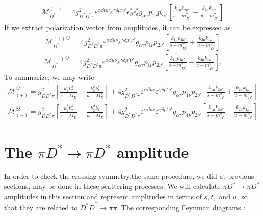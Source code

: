 \documentclass[aps,prd,preprintnumbers,showpacs,showkeys,nofootinbib,
superscriptaddress,fleqn,floatfix,tightenlines, 10pt]{revtex4-1}
\begin{document}
\begin{align}
	\mathcal{M}_{D^*}^{(-)} = 4g_{D^*D^*\pi}^2 \varepsilon^{\alpha \beta \mu \nu}
	\varepsilon^{\gamma \delta \mu' \nu'} \epsilon_\beta^* \epsilon_\delta^*
	g_{\alpha \gamma} p_{1\nu} p_{2\nu'} \left[
	\frac{k_{1\mu} k_{2\mu'}}{s - m_{D^*}^2} - \frac{k_{2\mu} k_{1\mu'}}{u - m_{D^*}^2}\right]
\end{align}
If we extract polarization vector from amplitudes, it can be expressed as
\begin{align}
	\mathcal{M}_{D^*}^{(+)\beta \delta} = 4g_{D^*D^*\pi}^2 \varepsilon^{\alpha \beta \mu \nu}
	\varepsilon^{\gamma \delta \mu' \nu'} g_{\alpha \gamma} p_{1\nu} p_{2\nu'} \left[
	\frac{k_{1\mu} k_{2\mu'}}{s - m_{D^*}^2} + \frac{k_{2\mu} k_{1\mu'}}{u - m_{D^*}^2}\right]
\end{align}
\begin{align}
	\mathcal{M}_{D^*}^{(-)\beta \delta} = 4g_{D^*D^*\pi}^2 \varepsilon^{\alpha \beta \mu \nu}
	\varepsilon^{\gamma \delta \mu' \nu'} g_{\alpha \gamma} p_{1\nu} p_{2\nu'} \left[
	\frac{k_{1\mu} k_{2\mu'}}{s - m_{D^*}^2} - \frac{k_{2\mu} k_{1\mu'}}{u - m_{D^*}^2}\right].
\end{align}
To summarize, we may write
\begin{align}
	\mathcal{M}_{(+)}^{\beta \delta} = g_{D D^* \pi}^2 \left[
	\frac{k_1^\beta k_2^\delta}{s - M_D^2} + \frac{k_2^\beta k_1^\delta}{u - M_D^2} \right]
	+ 4g_{D^*D^*\pi}^2 \varepsilon^{\alpha \beta \mu \nu}
	\varepsilon^{\gamma \delta \mu' \nu'} g_{\alpha \gamma} p_{1\nu} p_{2\nu'} \left[
	\frac{k_{1\mu} k_{2\mu'}}{s - m_{D^*}^2} + \frac{k_{2\mu} k_{1\mu'}}{u - m_{D^*}^2}\right]
\end{align}
\begin{align}
	\mathcal{M}_{(-)}^{\beta \delta} = g_{D D^* \pi}^2 \left[
	\frac{k_1^\beta k_2^\delta}{s - M_D^2} - \frac{k_2^\beta k_1^\delta}{u - M_D^2} \right]
	+ 4g_{D^*D^*\pi}^2 \varepsilon^{\alpha \beta \mu \nu}
	\varepsilon^{\gamma \delta \mu' \nu'} g_{\alpha \gamma} p_{1\nu} p_{2\nu'} \left[
	\frac{k_{1\mu} k_{2\mu'}}{s - m_{D^*}^2} - \frac{k_{2\mu} k_{1\mu'}}{u - m_{D^*}^2}\right]
\end{align}
\section{The $\pi D^* \rightarrow \pi D^*$ amplitude}
In order to check the crossing symmetry,the same procedure, we did at
previous sections, may be done in these scattering processes. We will
calculate $\pi D^* \rightarrow \pi D^*$ amplitudes in this section and
represent amplitudes in terms of $s,t,$ and $u$, so that they are related
to $D^* \bar{D}^* \rightarrow \pi\pi$. The corresponding Feynman diagrams :
\end{document}
